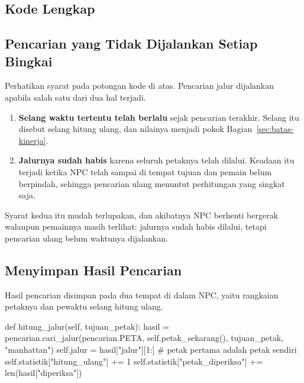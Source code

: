\subsection{Kode Lengkap}


\subsection{Pencarian yang Tidak Dijalankan Setiap Bingkai}

Perhatikan syarat pada potongan kode di atas. Pencarian jalur dijalankan
apabila salah satu dari dua hal terjadi.

\begin{enumerate}
  \item \textbf{Selang waktu tertentu telah berlalu} sejak pencarian terakhir.
        Selang itu disebut selang hitung ulang, dan nilainya menjadi pokok
        Bagian~\ref{sec:batas-kinerja}.
  \item \textbf{Jalurnya sudah habis} karena seluruh petaknya telah dilalui.
        Keadaan itu terjadi ketika NPC telah sampai di tempat tujuan dan
        pemain belum berpindah, sehingga pencarian ulang menuntut perhitungan
        yang singkat saja.
\end{enumerate}

Syarat kedua itu mudah terlupakan, dan akibatnya NPC berhenti bergerak
walaupun pemainnya masih terlihat: jalurnya sudah habis dilalui, tetapi
pencarian ulang belum waktunya dijalankan.

\subsection{Menyimpan Hasil Pencarian}

Hasil pencarian disimpan pada dua tempat di dalam NPC, yaitu rangkaian
petaknya dan pewaktu selang hitung ulang.

\begin{kodekeluaran}
def hitung_jalur(self, tujuan_petak):
    hasil = pencarian.cari_jalur(pencarian.PETA, self.petak_sekarang(),
                                 tujuan_petak, "manhattan")
    self.jalur = hasil["jalur"][1:]     # petak pertama adalah petak sendiri
    self.statistik["hitung_ulang"] += 1
    self.statistik["petak_diperiksa"] += len(hasil["diperiksa"])
\end{kodekeluaran}

